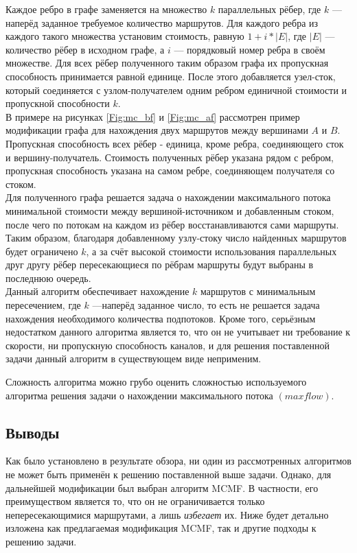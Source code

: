 \documentclass[a4paper]{article}
\begin{document}
Каждое ребро в графе заменяется на множество $k$ параллельных рёбер, где $k$ --- наперёд заданное требуемое количество маршрутов. Для каждого ребра из каждого такого множества установим стоимость, равную $1+i*|E|$, где $|E|$ --- количество рёбер в исходном графе, а $i$ --- порядковый номер ребра в своём множестве.
Для всех рёбер полученного таким образом графа их пропускная способность принимается равной единице. После этого добавляется узел-сток, который соединяется с узлом-получателем одним ребром единичной стоимости и пропускной способности $k$.\\
В примере на рисунках \ref{Fig:mc_bf} и \ref{Fig:mc_af} рассмотрен пример модификации графа для нахождения двух маршрутов между вершинами $A$ и $B$. Пропускная способность всех рёбер - единица, кроме ребра, соединяющего сток и вершину-получатель. Стоимость полученных рёбер указана рядом с ребром, пропускная способность указана на самом ребре,  соединяющем получателя со стоком.\\
Для полученного графа решается задача о нахождении максимального потока минимальной стоимости между вершиной-источником и добавленным стоком, после чего по потокам на каждом из рёбер восстанавливаются сами маршруты.
Таким образом, благодаря добавленному узлу-стоку число найденных маршрутов будет ограничено $k$, а за счёт высокой стоимости использования параллельных друг другу рёбер пересекающиеся по рёбрам маршруты будут выбраны в последнюю очередь.\\
Данный алгоритм обеспечивает нахождение $k$ маршрутов с минимальным пересечением, где $k$ ---наперёд заданное число, то есть не решается задача нахождения необходимого количества подпотоков. Кроме того, серьёзным недостатком данного алгоритма является то, что он не учитывает ни требование к скорости, ни пропускную способность каналов, и для решения поставленной задачи данный алгоритм в существующем виде неприменим.

Сложность алгоритма можно грубо оценить сложностью используемого алгоритма решения задачи о нахождении максимального потока $(maxflow)$.

\subsection{Выводы}
Как было установлено в результате обзора, ни один из рассмотренных алгоритмов не может быть применён к решению поставленной выше задачи. Однако, для дальнейшей модификации был выбран алгоритм MCMF. В частности, его преимуществом является то, что он не ограничивается только непересекающимися маршрутами, а лишь \textit{избегает} их. Ниже будет детально изложена как предлагаемая модификация MCMF, так и другие подходы к решению задачи.
\end{document}
